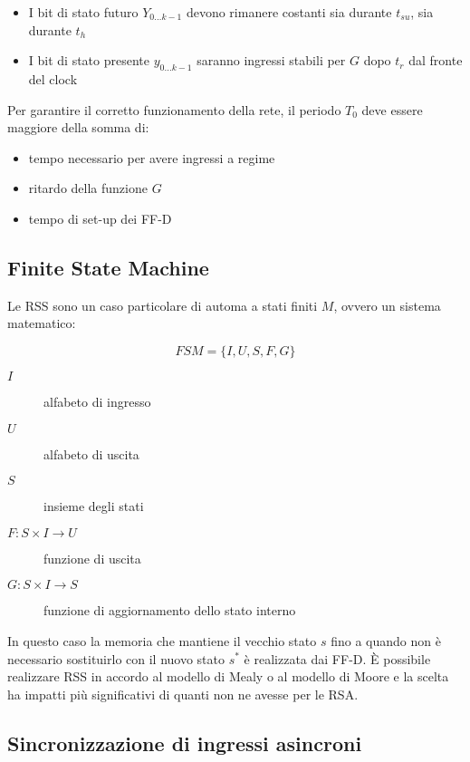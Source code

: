 \documentclass{article}
\begin{document}
\begin{itemize}
    \item I bit di stato futuro $Y_{0 \dots k-1}$ devono rimanere costanti sia durante $t_{su}$, sia durante $t_h$
    \item I bit di stato presente $y_{0 \dots k-1}$ saranno ingressi stabili per $G$ dopo $t_r$ dal fronte del clock
\end{itemize}

\noindent
Per garantire il corretto funzionamento della rete, il periodo $T_0$ deve essere maggiore della somma di:

\begin{itemize}
\item tempo necessario per avere ingressi a regime
\item ritardo della funzione $G$
\item tempo di set-up dei FF-D
\end{itemize}

\subsection{Finite State Machine}

Le RSS sono un caso particolare di automa a stati finiti $M$, ovvero un sistema matematico:

$$
FSM = \{ I,U,S,F,G \}
$$

\begin{description}
    \item[$I$] alfabeto di ingresso
    \item[$U$] alfabeto di uscita
    \item[$S$] insieme degli stati
\end{description}

\begin{description}
    \item[$F: S \times I \to U$] funzione di uscita
    \item[$G: S \times I \to S$] funzione di aggiornamento dello stato interno
\end{description}

\noindent
In questo caso la memoria che mantiene il vecchio stato $s$ fino a quando non è necessario sostituirlo con il nuovo stato $s^*$ è realizzata dai FF-D.
È possibile realizzare RSS in accordo al modello di Mealy o al modello di Moore e la scelta ha impatti più significativi di quanti non ne avesse per le RSA.

\subsection{Sincronizzazione di ingressi asincroni}
\end{document}
